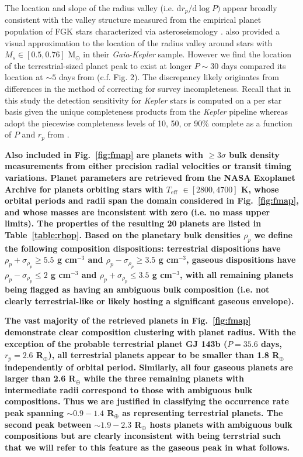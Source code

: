 \documentclass[twocolumn]{emulateapj}
\newcommand{\gaia}[1]{\emph{Gaia}#1}
\newcommand{\kepler}[1]{\emph{Kepler}#1}
\newcommand{\teff}[1]{$T_{\text{eff}}$#1}
\begin{document}
The location and slope of the radius valley (i.e. $\text{d}r_p/\text{d}\log{P})$ appear broadly consistent
with the valley structure measured from the empirical planet population of FGK stars characterized via
asteroseismology \citep{vaneylen18}. \cite{wu19} also provided a visual approximation to the location of the
radius valley around stars with $M_s \in [0.5,0.76]$ M$_{\odot}$ in their \gaia{-}\kepler{} sample. However
we find the location of the terrestrial-sized planet peak to exist at longer $P \sim 30$ days compared its
location at $\sim 5$ days from \cite{wu19} (c.f. Fig. 2). The discrepancy likely originates from differences
in the method of correcting for survey incompleteness.
Recall that in this study the detection sensitivity for \kepler{} stars is computed on a per star basis
given the unique completeness products from the \kepler{} pipeline whereas \cite{wu19} adopt the piecewise
completeness levels of 10, 50, or 90\% complete as a function of $P$ and $r_p$ from \cite{zhu18b}.

\textbf{Also included in Fig.~\ref{fig:fmap} are planets
  with $\geq 3\sigma$ bulk density measurements from either precision radial velocities or
  transit timing variations.
  Planet parameters are retrieved from the NASA Exoplanet Archive for planets orbiting stars with
  \teff{} $\in[2800,4700]$ K, whose orbital periods and radii span the domain considered in Fig.~\ref{fig:fmap},
  and whose masses are inconsistent with zero (i.e. no mass upper limits).
  The properties of the resulting 20 planets are listed in Table~\ref{table:rhop}. Based on the
  planetary bulk densities $\rho_p$ we define the following composition dispositions: terrestrial
  dispositions
  have $\rho_p+\sigma_{\rho_p} \geq 5.5$ g cm$^{-3}$ and $\rho_p-\sigma_{\rho_p} \geq 3.5$ g cm$^{-3}$,
  gaseous dispositions 
  have $\rho_p-\sigma_{\rho_p} \leq 2$ g cm$^{-3}$ and $\rho_p+\sigma_{\rho_p} \leq 3.5$ g cm$^{-3}$,
  with all remaining planets being flagged as having an ambiguous bulk composition (i.e. not clearly
  terrestrial-like or likely hosting a significant gaseous envelope).}

  \textbf{The vast majority of the retrieved planets in Fig.~\ref{fig:fmap}
  demonstrate clear composition clustering with planet radius.
  With the exception of the probable terrestrial planet GJ 143b ($P=35.6$ days, $r_p=2.6$ R$_{\oplus}$),
  all terrestrial planets appear to be smaller than 1.8 R$_{\oplus}$ independently of orbital period.
  Similarly, all four gaseous planets are larger than 2.6 R$_{\oplus}$ while the three remaining planets
  with intermediate radii correspond to those with ambiguous bulk compositions. 
  Thus we are justified in classifying the occurrence rate peak spanning $\sim 0.9-1.4$ R$_{\oplus}$
  as representing terrestrial planets. The second peak between $\sim 1.9-2.3$ R$_{\oplus}$ hosts
  planets with ambiguous bulk compositions but are clearly inconsistent with being terrstrial
  such that we will refer to this feature as the gaseous peak in what follows.}
\end{document}
